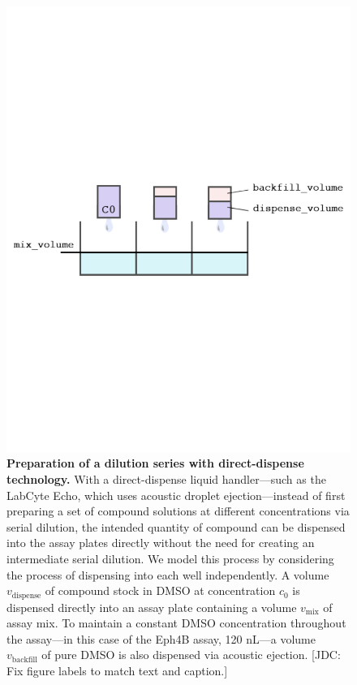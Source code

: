 \documentclass[aps,pre,twocolumn,nofootinbib,superscriptaddress,linenumbers]{revtex4-1}
\begin{document}
\begin{figure}[tb]
    \includegraphics[trim={0 9cm 0 9cm},clip,width=\columnwidth]{../figures/direct_dispense.pdf}

  \caption{{\bf Preparation of a dilution series with direct-dispense technology.}
  With a direct-dispense liquid handler---such as the LabCyte Echo, which uses acoustic droplet ejection---instead of first preparing a set of compound solutions at different concentrations via serial dilution, the intended quantity of compound can be dispensed into the assay plates directly without the need for creating an intermediate serial dilution.
  We model this process by considering the process of dispensing into each well independently.
  A volume $v_\mathrm{dispense}$ of compound stock in DMSO at concentration $c_0$ is dispensed directly into an assay plate containing a volume $v_\mathrm{mix}$ of assay mix.
  To maintain a constant DMSO concentration throughout the assay---in this case of the Eph4B assay, 120 nL---a volume $v_\mathrm{backfill}$ of pure DMSO is also dispensed via acoustic ejection.
  {\color{red}[JDC: Fix figure labels to match text and caption.]}
  }
  \label{fig:direct_dispense}
\end{figure}
\end{document}
